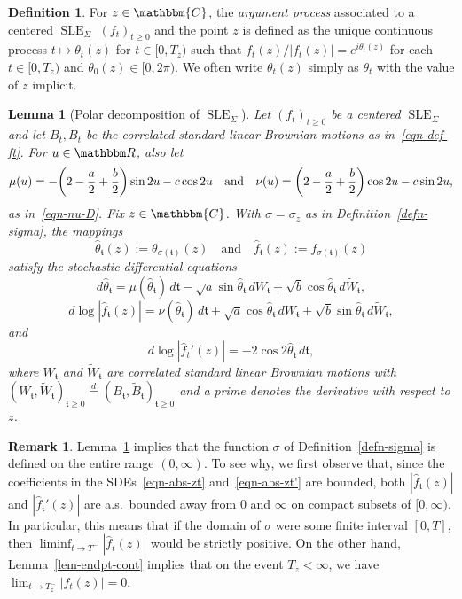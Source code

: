\documentclass[11pt]{article}
\theoremstyle{plain}
\newtheorem{lem}[thm]{Lemma}
\theoremstyle{definition}
\newtheorem{defn}[thm]{Definition}
\newtheorem{remark}[thm]{Remark}
\numberwithin{equation}{section}
\newcommand{\eqb}{\begin{equation}}
\newcommand{\eqe}{\end{equation}}
\newcommand{\eqbn}{\begin{equation*}}
\newcommand{\eqen}{\end{equation*}}
\newcommand{\BB}{\mathbbm}
\newcommand{\eqD}{\overset{d}{=}}
\newcommand{\rta}{\rightarrow}
\newcommand{\wt}{\widetilde}
\newcommand{\wh}{\widehat}
\newcommand{\SLEG}{{\operatorname{SLE}}_\Sigma}
\newcommand{\tz}{{\mathfrak t}}
\let\originalleft\left
\let\originalright\right
\renewcommand{\left}{\mathopen{}\mathclose\bgroup\originalleft}
\renewcommand{\right}{\aftergroup\egroup\originalright}
\begin{document}
\begin{defn} \label{def-arg}
For $z \in \BB{C}$, the \emph{argument process} associated to a centered $\SLEG$ $(f_t)_{t \geq 0}$ and the point $z$ is defined as the unique continuous process $t\mapsto \theta_t(z)$ for $t\in [0,T_z)$ such that $f_t(z) / |f_t(z)| = e^{i \theta_t(z)}$ for each $t\in [0,T_z)$ and $ \theta_0(z) \in [0,2\pi)$.  We often write $\theta_t(z)$ simply as $\theta_t$ with the value of $z$ implicit.
\end{defn}


\begin{lem}[Polar decomposition of $\SLEG$]
\label{lem-polar}
Let $(f_t)_{t \geq 0}$ be a centered $\SLEG$ and let $B_t,\wt B_t$ be the correlated standard linear Brownian motions as in~\eqref{eqn-def-ft}.
For $u\in\BB R$, also let
\eqb \label{eqn-def-mu} 
\mu(u) =  -\left(2-\frac{a}{2} + \frac{b}{2}\right) \sin{2u} - c \cos{2u} \quad\text{and} \quad 
\nu(u) = \left(2-\frac{a}{2} + \frac{b}{2}\right) \cos{2u} - c \sin{2u} ,
\eqe
as in~\eqref{eqn-nu-D}. 
Fix $z \in \BB{C}$.  With $\sigma = \sigma_z$ as in Definition~\ref{defn-sigma}, %
the mappings  
\eqbn
\wh \theta_\tz(z) := \theta_{\sigma(\tz)}(z) \quad \text{and} \quad \wh f_\tz(z) := f_{\sigma(\tz)}(z)
\eqen
satisfy the stochastic differential equations
\eqb
d\wh\theta_\tz = \mu(\wh\theta_\tz) \, d\tz - \sqrt{a}\sin{\wh\theta_\tz}  \, dW_\tz + \sqrt{b}\cos{\wh\theta_\tz}  \, d\wt W_\tz,
\label{eqn-theta-t}
\eqe
\eqb
d\log|\wh f_\tz(z)| = \nu(\wh\theta_\tz) \, d\tz + \sqrt{a}\cos{\wh\theta_\tz}\, dW_\tz + \sqrt{b}\sin{\wh\theta_\tz}\,  d\wt W_\tz,
\label{eqn-abs-zt}
\eqe
and
\eqb
d\log|\wh f_{t}'(z)| = -2 \cos{2 \wh{\theta}_\tz } \, d\tz,
\label{eqn-abs-zt'}
\eqe
where $W_\tz$ and $\wt W_\tz$ are correlated standard linear Brownian motions with $(W_\tz,\wt W_\tz)_{\tz\geq 0} \eqD (B_\tz, \wt B_\tz)_{\tz\geq 0} $ and a prime denotes the derivative with respect to $z$. 
\end{lem}


\begin{remark}
Lemma~\ref{lem-polar} implies that the function $\sigma$ of Definition~\ref{defn-sigma} is defined on the entire range $(0,\infty)$.  To see why, we first observe that, since the coefficients in the SDEs~\eqref{eqn-abs-zt} and~\eqref{eqn-abs-zt'} are bounded, both $|\wh f_\tz(z)|$ and $|\wh f_\tz'(z)|$ are a.s.\ bounded away from $0$ and $\infty$ on compact subsets of $[0,\infty)$.  
In particular, this means that if the domain of $\sigma$ were some finite interval $[0,T]$, then $\liminf_{t \rta T^-} |\wh f_t(z)|$ would be strictly positive. On the other hand, Lemma~\ref{lem-endpt-cont} implies that on the event $T_z < \infty$, we have $\lim_{t \rta T_z^-} |f_t(z)| = 0$. \label{remark-sigma}
\end{remark}
\end{document}
